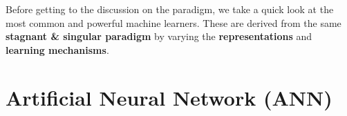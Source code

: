 \documentclass[12pt]{article}  %
\begin{document}

Before getting to the discussion on the paradigm, we take a quick look at the most common and powerful machine learners. These are derived from the same {\bf stagnant \& singular paradigm} by varying the {\bf representations} and {\bf learning mechanisms}.









\section{Artificial Neural Network (ANN)}
\end{document}
